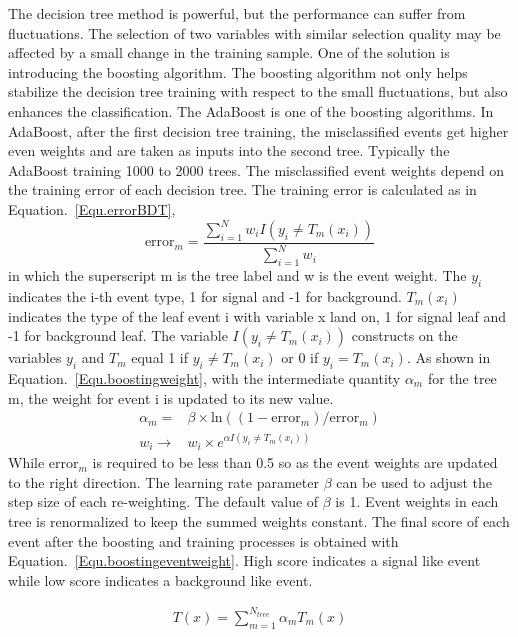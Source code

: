 The decision tree method is powerful, but the performance can suffer from fluctuations. The selection of two variables with similar selection quality may be affected by a small change in the training sample. One of the solution is introducing the boosting algorithm. The boosting algorithm not only helps stabilize the decision tree training with respect to the small fluctuations, but also enhances the classification. The AdaBoost is one of the boosting algorithms. In AdaBoost, after the first decision tree training, the misclassified events get higher even weights and are taken as inputs into the second tree. Typically the AdaBoost training 1000 to 2000 trees. The misclassified event weights depend on the training error of each decision tree. The training error is calculated as in Equation.~\ref{Equ.errorBDT},
\begin{equation}\label{Equ.errorBDT} 
\textrm{error}_{m}=\frac{\sum_{i=1}^{N}w_{i}I(y_{i}\neq T_{m}(x_{i}))}{\sum_{i=1}^{N}w_{i}} 
\end{equation}
in which the superscript m is the tree label and w is the event weight. The $y_{i}$ indicates the i-th event type, 1 for signal and -1 for background. $T_{m}(x_{i})$ indicates the type of the leaf event i with variable x land on, 1 for signal leaf and -1 for background leaf. The variable $I(y_{i}\neq T_{m}(x_{i}))$ constructs on the variables $y_{i}$ and $T_{m}$ equal 1 if $y_{i}\neq T_{m}(x_{i})$ or 0 if $y_{i}= T_{m}(x_{i})$. As shown in Equation.~\ref{Equ.boostingweight}, with the intermediate quantity $\alpha_{m}$ for the tree m, the weight for event i is updated to its new value. 
\begin{align}\label{Equ.boostingweight} 
\alpha_{m}=&\beta\times \textrm{ln}((1-\textrm{error}_{m})/\textrm{error}_{m})\\
w_{i}\rightarrow &w_{i}\times e^{\alpha I(y_{i}\neq T_{m}(x_{i}))} 
\end{align}
While $\textrm{error}_{m}$ is required to be less than 0.5 so as the event weights are updated to the right direction. The learning rate parameter $\beta$ can be used to adjust the step size of each re-weighting. The default value of $\beta$ is 1. Event weights in each tree is renormalized to keep the summed weights constant. The final score of each event after the boosting and training processes is obtained with Equation.~\ref{Equ.boostingeventweight}. High score indicates a signal like event while low score indicates a background like event.


\begin{align}\label{Equ.boostingeventweight} 
T(x)=\sum_{m=1}^{N_{tree}}\alpha_{m}T_{m}(x)
\end{align}



